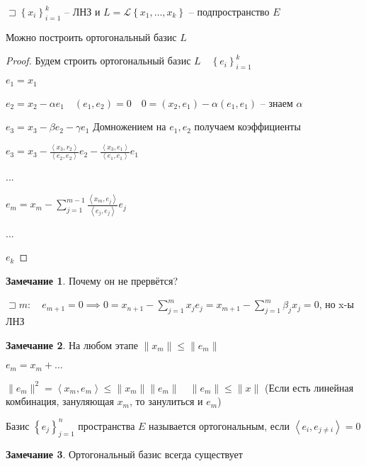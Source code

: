 \documentclass{book}
\theoremstyle{definition}
\newtheorem*{note}{Замечание}
\begin{document}
 \begin{theorem}

     $\sqsupset \left\{ x_i \right\} _{i=1}^k$ -- ЛНЗ и $L = \mathscr L\left\{ x_1, \ldots, x_k \right\} $ -- подпространство $E$

     Можно построить ортогональный базис  $L$
 \end{theorem}
 \begin{proof}
     Будем строить ортогональный базис $L\quad \left\{ e_i \right\} _{i=1}^k$

     $e_1 = x_1$

     $e_2 = x_2 - \alpha e_1\quad \left( e_1, e_2 \right) = 0 \quad 0 = \left( x_2, e_1 \right)  - \alpha \left( e_1, e_1 \right) $ -- знаем $\alpha$

      $e_3 = x_3 - \beta e_2 - \gamma e_1$ Домножением на $e_1, e_2$ получаем коэффициенты

        $e_3 = x_3 - \frac{\left<x_3, r_2 \right>}{\left<e_2, e_2 \right>}e_2 - \frac{\left<x_3, e_1 \right>}{\left<e_1, e_1 \right>}e_1$ 

        ...

        $e_m = x_m - \sum_{j=1}^{m-1} \frac{\left<x_m, e_j \right>}{\left<e_j, e_j \right>}e_j$
        
        ...

        $e_k$
 \end{proof}

\begin{note}
    Почему он не прервётся?

    $\sqsupset m:\quad e_{m+1} = 0 \implies 0 = x_{n+1} - \sum_{j=1}^{m} x_je_j = x_{m+1} - \sum_{j=1}^{m} \beta_jx_j = 0$, но x-ы ЛНЗ
\end{note}
\begin{note}
    На любом этапе $\|x_m\| \leqslant \|e_m\|$

    $e_m = x_m + \ldots\quad $

    $\|e_m\|^2 = \left<x_m, e_m \right> \leqslant \|x_m\|\|e_m\|\quad \|e_m\| \leqslant \|x\|$ (Если есть линейная комбинация, зануляющая $x_m$, то занулиться и  $e_m$)
\end{note}

\begin{definition}
    Базис $\left\{ e_j \right\} _{j=1}^n$ пространства $E$ называется ортогональным, если  $\left<e_i, e_{j\neq i} \right> = 0$
\end{definition}

\begin{note}
    Ортогональный базис всегда существует
\end{note}
\end{document}
